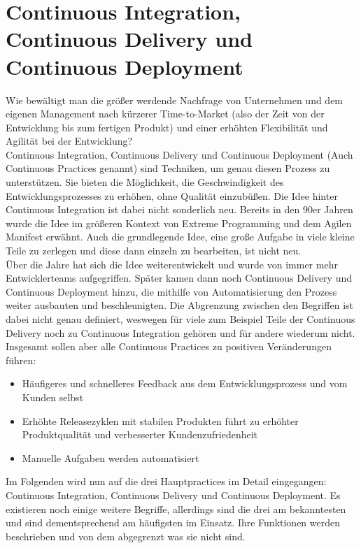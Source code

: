 \section{Continuous Integration, Continuous Delivery und Continuous Deployment}\label{CP}
Wie bewältigt man die größer werdende Nachfrage von Unternehmen und dem eigenen Management nach kürzerer Time-to-Market (also der Zeit von der Entwicklung bis zum fertigen Produkt) und einer erhöhten Flexibilität und Agilität bei der Entwicklung?\autocite{Capgemini.2017}\\ Continuous Integration, Continuous Delivery und Continuous Deployment (Auch Continuous Practices genannt) sind Techniken, um genau diesen Prozess zu unterstützen.  Sie bieten die Möglichkeit, die Geschwindigkeit des Entwicklungsprozesses zu erhöhen, ohne Qualität einzubüßen.\autocite[Vgl.][S.2]{Shahin.2017}
Die Idee hinter Continuous Integration ist dabei nicht sonderlich neu. Bereits in den 90er Jahren wurde die Idee im größeren Kontext von Extreme Programming und dem Agilen Manifest erwähnt.\autocite[Vgl.][S.2]{Stahl.2018} Auch die grundlegende Idee, eine große Aufgabe in viele kleine Teile zu zerlegen und diese dann einzeln zu bearbeiten, ist nicht neu.\\ Über die Jahre hat sich die Idee weiterentwickelt und wurde von immer mehr Entwicklerteams aufgegriffen. Später kamen dann noch Continuous Delivery und Continuous Deployment hinzu, die mithilfe von Automatisierung den Prozess weiter ausbauten und beschleunigten. Die Abgrenzung zwischen den Begriffen ist dabei nicht genau definiert, weswegen für viele zum Beispiel Teile der Continuous Delivery noch zu Continuous Integration gehören und für andere wiederum nicht. Insgesamt sollen aber alle Continuous Practices zu positiven Veränderungen führen:\autocite[Vgl.][S.2]{Shahin.2017}
\begin{itemize}
	\item Häufigeres und schnelleres Feedback aus dem Entwicklungsprozess und vom Kunden selbst 
	\item Erhöhte Releasezyklen mit stabilen Produkten führt zu erhöhter Produktqualität und verbesserter Kundenzufriedenheit
	\item Manuelle Aufgaben werden automatisiert
\end{itemize}
Im Folgenden wird nun auf die drei Hauptpractices im Detail eingegangen: Continuous Integration, Continuous Delivery und Continuous Deployment. Es existieren noch einige weitere Begriffe, allerdings sind die drei am bekanntesten und sind dementsprechend am häufigsten im Einsatz. Ihre Funktionen werden beschrieben und von dem abgegrenzt was sie nicht sind. 
